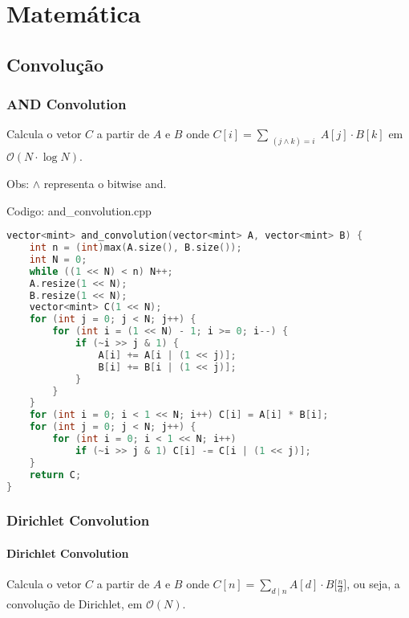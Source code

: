 \documentclass[10pt, a4paper, oneside]{book}
\begin{document}
\newpage

%
%
%
%

\chapter{Matemática}

\section{Convolução}
\subsection{AND Convolution}


Calcula o vetor $C$ a partir de $A$ e $B$ onde $C[i] = \sum_{\substack{(j \land k) = i}} A[j] \cdot B[k]$ em $\mathcal{O}(N \cdot \log N)$.



Obs: $\land$ representa o bitwise and.

\hfill

Codigo: and\_convolution.cpp

\begin{lstlisting}[language=C++]
vector<mint> and_convolution(vector<mint> A, vector<mint> B) {
    int n = (int)max(A.size(), B.size());
    int N = 0;
    while ((1 << N) < n) N++;
    A.resize(1 << N);
    B.resize(1 << N);
    vector<mint> C(1 << N);
    for (int j = 0; j < N; j++) {
        for (int i = (1 << N) - 1; i >= 0; i--) {
            if (~i >> j & 1) {
                A[i] += A[i | (1 << j)];
                B[i] += B[i | (1 << j)];
            }
        }
    }
    for (int i = 0; i < 1 << N; i++) C[i] = A[i] * B[i];
    for (int j = 0; j < N; j++) {
        for (int i = 0; i < 1 << N; i++)
            if (~i >> j & 1) C[i] -= C[i | (1 << j)];
    }
    return C;
}
\end{lstlisting}
\hfill

\subsection{Dirichlet Convolution}
\subsubsection{Dirichlet Convolution}


Calcula o vetor $C$ a partir de $A$ e $B$ onde $C[n] = \sum_{d \mid n} A[d] \cdot B\Big[\frac{n}{d}\Big]$, ou seja, a convolução de Dirichlet, em $\mathcal{O}(N)$.
\end{document}
